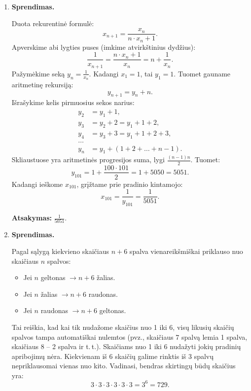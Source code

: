 \documentclass[11pt,a4paper]{article}
\begin{document}
\begin{enumerate}
    \textbf{Atsakymas:} $5$.

    \vspace{0.3cm}
    \item \textbf{Sprendimas.}
    
    Duota rekurentinė formulė:
    \[ x_{n+1} = \frac{x_n}{n \cdot x_n + 1}. \]
    Apverskime abi lygties puses (imkime atvirkštinius dydžius):
    \[ \frac{1}{x_{n+1}} = \frac{n \cdot x_n + 1}{x_n} = n + \frac{1}{x_n}. \]
    Pažymėkime seką $y_n = \frac{1}{x_n}$. Kadangi $x_1 = 1$, tai $y_1 = 1$. Tuomet gauname aritmetinę rekursiją:
    \[ y_{n+1} = y_n + n. \]
    Išrašykime kelis pirmuosius sekos narius:
    \begin{align*}
        y_2 &= y_1 + 1, \\
        y_3 &= y_2 + 2 = y_1 + 1 + 2, \\
        y_4 &= y_3 + 3 = y_1 + 1 + 2 + 3, \\
        \dots \\
        y_n &= y_1 + (1 + 2 + \dots + n - 1).
    \end{align*}
    Skliaustuose yra aritmetinės progresijos suma, lygi $\frac{(n-1)n}{2}$. Tuomet:
    \[ y_{101} = 1 + \frac{100 \cdot 101}{2} = 1 + 5050 = 5051. \]
    Kadangi ieškome $x_{101}$, grįžtame prie pradinio kintamojo:
    \[ x_{101} = \frac{1}{y_{101}} = \frac{1}{5051}. \]
    
    \textbf{Atsakymas:} $\frac{1}{5051}$.

    \vspace{0.3cm}
    \item \textbf{Sprendimas.}
    
    Pagal sąlygą kiekvieno skaičiaus $n+6$ spalva vienareikšmiškai priklauso nuo skaičiaus $n$ spalvos:
    \begin{itemize}
        \item Jei $n$ geltonas $\to n+6$ žalias.
        \item Jei $n$ žalias $\to n+6$ raudonas.
        \item Jei $n$ raudonas $\to n+6$ geltonas.
    \end{itemize}
    Tai reiškia, kad kai tik nudažome skaičius nuo 1 iki 6, visų likusių skaičių spalvos tampa automatiškai nulemtos (pvz., skaičiaus 7 spalvą lemia 1 spalva, skaičiaus 8 -- 2 spalva ir t.\,t.).
    Skaičiams nuo 1 iki 6 nudažyti jokių pradinių apribojimų nėra. Kiekvienam iš 6 skaičių galime rinktis iš 3 spalvų nepriklausomai vienas nuo kito. 
    Vadinasi, bendras skirtingų būdų skaičius yra:
    \[ 3 \cdot 3 \cdot 3 \cdot 3 \cdot 3 \cdot 3 = 3^6 = 729. \]
    

\end{enumerate}
\end{document}
